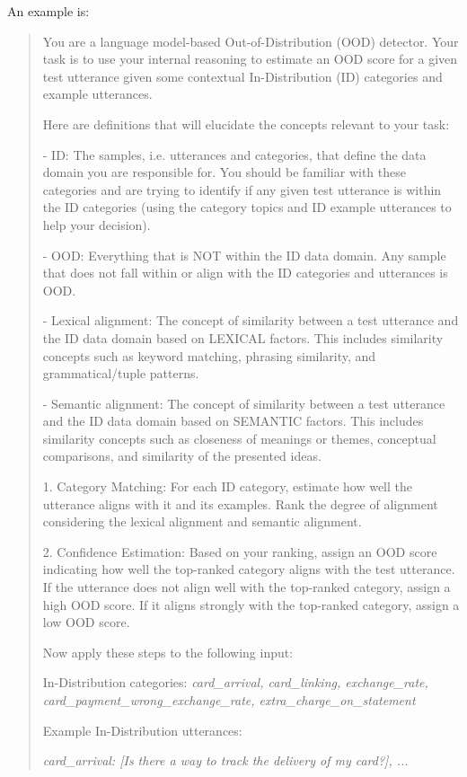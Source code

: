 An example is:
\begin{quote}
You are a language model-based Out-of-Distribution (OOD) detector. Your task is to use your internal reasoning to estimate an OOD score for a given test utterance given some contextual In-Distribution (ID) categories and example utterances.

Here are definitions that will elucidate the concepts relevant to your task:

- ID: The samples, i.e. utterances and categories, that define the data domain you are responsible for. You should be familiar with these categories and are trying to identify if any given test utterance is within the ID categories (using the category topics and ID example utterances to help your decision).

- OOD: Everything that is NOT within the ID data domain. Any sample that does not fall within or align with the ID categories and utterances is OOD.

- Lexical alignment: The concept of similarity between a test utterance and the ID data domain based on LEXICAL factors. This includes similarity concepts such as keyword matching, phrasing similarity, and grammatical/tuple patterns.

- Semantic alignment: The concept of similarity between a test utterance and the ID data domain based on SEMANTIC factors. This includes similarity concepts such as closeness of meanings or themes, conceptual comparisons, and similarity of the presented ideas.

1. Category Matching: For each ID category, estimate how well the utterance aligns with it and its examples. Rank the degree of alignment considering the lexical alignment and semantic alignment.

2. Confidence Estimation: Based on your ranking, assign an OOD score indicating how well the top-ranked category aligns with the test utterance. If the utterance does not align well with the top-ranked category, assign a high OOD score. If it aligns strongly with the top-ranked category, assign a low OOD score.

Now apply these steps to the following input:

In-Distribution categories: \textit{card\_arrival, card\_linking, exchange\_rate, card\_payment\_wrong\_exchange\_rate, extra\_charge\_on\_statement}

Example In-Distribution utterances:

\textit{card\_arrival: [Is there a way to track the delivery of my card?], ...}


\end{quote}
